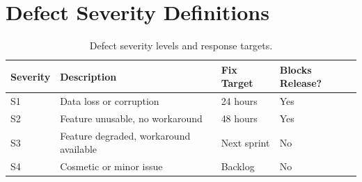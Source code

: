 \documentclass[
    language=english,
    doctype=technical-report,
    institution=none,
    titlestyle=book,
    oneside,
]{../../omnilatex}
\begin{document}
\section{Defect Severity Definitions}

\begin{table}[htbp]
    \centering
    \caption{Defect severity levels and response targets.}
    \label{tab:defects}
    \begin{tabular}{@{}lp{5cm}p{3cm}p{2cm}@{}}
        \toprule
        Severity & Description & Fix Target & Blocks Release? \\
        \midrule
        S1 & Data loss or corruption & 24 hours & Yes \\
        S2 & Feature unusable, no workaround & 48 hours & Yes \\
        S3 & Feature degraded, workaround available & Next sprint & No \\
        S4 & Cosmetic or minor issue & Backlog & No \\
        \bottomrule
    \end{tabular}
\end{table}

\printbibliography[heading=bibintoc, title={References}]
\end{document}
